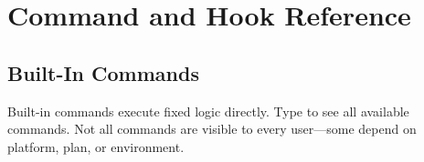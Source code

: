 \chapter{Command and Hook Reference}
\label{app:reference}


\section{Built-In Commands}

Built-in commands execute fixed logic directly.
Type \code{/} to see all available commands.
Not all commands are visible to every user---some depend on
platform, plan, or environment.


